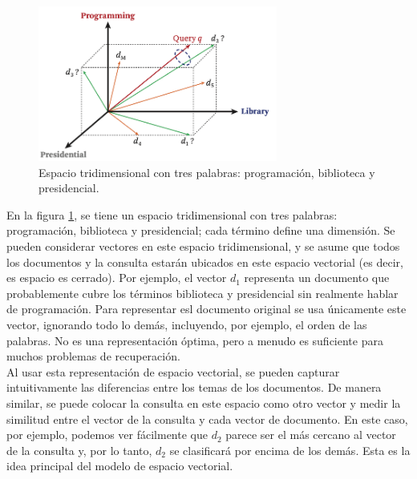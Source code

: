 \begin{figure}[h]
\centering
\includegraphics[width=0.7\textwidth]{fotos/17.png}
\caption{Espacio tridimensional con tres palabras: programación, biblioteca y presidencial.}
\label{fig:6.2}
\end{figure}

En la figura \ref{fig:6.2}, se tiene un espacio tridimensional con tres palabras: programación, biblioteca y presidencial; cada término define una dimensión. Se pueden considerar vectores en este espacio tridimensional, y se asume que todos los documentos y la consulta estarán ubicados en este espacio vectorial (es decir, es espacio es cerrado). Por ejemplo, el vector $d_1$ representa un documento que probablemente cubre los términos biblioteca y presidencial sin realmente hablar de programación. Para representar esl documento original se usa únicamente este vector, ignorando todo lo demás, incluyendo, por ejemplo, el orden de las palabras. No es una representación óptima, pero a menudo es suficiente para muchos problemas de recuperación. \\

Al usar esta representación de espacio vectorial, se pueden capturar intuitivamente las diferencias entre los temas de los documentos. De manera similar, se puede colocar la consulta en este espacio como otro vector y medir la similitud entre el vector de la consulta y cada vector de documento. En este caso, por ejemplo, podemos ver fácilmente que $d_2$ parece ser el más cercano al vector de la consulta y, por lo tanto, $d_2$ se clasificará por encima de los demás. Esta es la idea principal del modelo de espacio vectorial. \\

